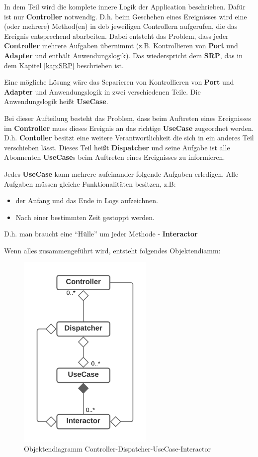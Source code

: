 
In dem Teil wird die komplete innere Logik der Application beschrieben. Dafür ist nur \textbf{Controller} notwendig. 
D.h. beim Geschehen eines Ereignisses wird eine (oder mehrere) Method(en) in deb jeweiligen Controllern aufgerufen,
die das Ereignis entsprechend abarbeiten.
Dabei entsteht das Problem, dass
jeder \textbf{Controller} mehrere Aufgaben übernimmt 
(z.B. Kontrollieren von \textbf{Port} und \textbf{Adapter} und enthält Anwendungslogik).
Das wiederspricht dem \textbf{SRP}, das in dem Kapitel \ref{kap:SRP} beschrieben ist.

Eine mögliche Lösung wäre das Separieren von Kontrollieren von \textbf{Port} und \textbf{Adapter} und Anwendungslogik
in zwei verschiedenen Teile. Die Anwendungslogik heißt \textbf{UseCase}.

Bei dieser Aufteilung besteht das Problem, dass beim Auftreten eines Ereignisses im \textbf{Controller} muss dieses Ereignis an das 
richtige \textbf{UseCase} zugeordnet werden. D.h. \textbf{Contoller} besitzt eine weitere Verantwortlichkeit die sich in ein anderes Teil
verschieben lässt. Dieses Teil heißt \textbf{Dispatcher} und seine Aufgabe ist alle Abonnenten \textbf{UseCase}s
beim Auftreten eines Ereignisses zu informieren.

Jedes \textbf{UseCase} kann mehrere aufeinander folgende Aufgaben erledigen.
Alle Aufgaben müssen gleiche Funktionalitäten besitzen, z.B:
\begin{itemize}
    \item der Anfang und das Ende in Logs aufzeichnen.
    \item Nach einer bestimmten Zeit gestoppt werden.
\end{itemize}
D.h. man braucht eine ``Hülle'' um jeder Methode - \textbf{Interactor}

Wenn alles zusammengeführt wird, entsteht folgendes Objektendiamm:

\begin{figure}[H]
    \centering
    \includegraphics[width=6.5cm]{./images/Controller-Dispatcher-UseCase-Interactor.png}
     \caption[Objektendiagramm Controller-Dispatcher-UseCase-Interactor]{Objektendiagramm Controller-Dispatcher-UseCase-Interactor}
     \label{fig:CDCDUI}
\end{figure}
